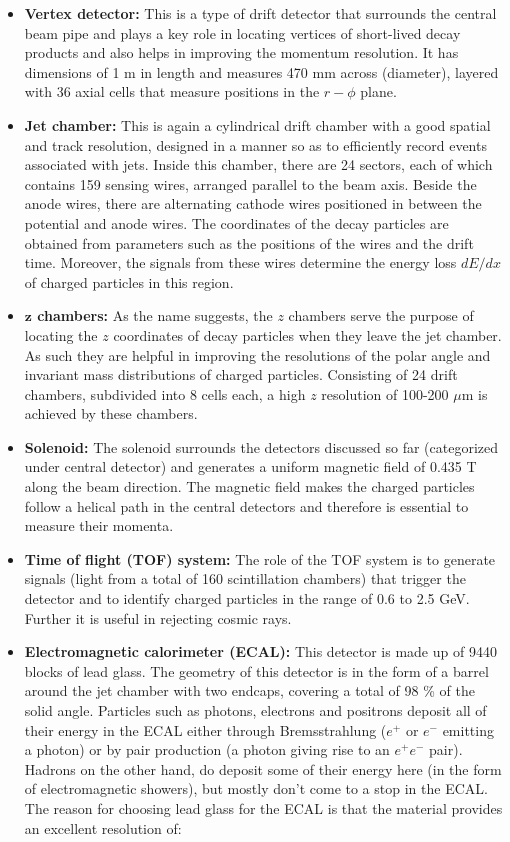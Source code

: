 \begin{itemize}
\item \textbf{Vertex detector:} This is a type of drift detector that surrounds the central beam pipe and plays a key role in locating vertices of short-lived decay products and also helps in improving the momentum resolution. It has dimensions of 1 m in length and measures 470 mm across (diameter), layered with 36 axial cells that measure positions in the $r-\phi$ plane.  
\item \textbf{Jet chamber:} This is again a cylindrical drift chamber with a good spatial and track resolution, designed in a manner so as to efficiently record events associated with jets. Inside this chamber, there are 24 sectors, each of which contains 159 sensing wires, arranged parallel to the beam axis. Beside the anode wires, there are alternating cathode wires positioned in between the potential and anode wires. The coordinates of the decay particles are obtained from parameters such as the positions of the wires and the drift time. Moreover, the signals from these wires determine the energy loss $dE/dx$ of charged particles in this region.
\item \textbf{$\mathbf{z}$ chambers:} As the name suggests, the $z$ chambers serve the purpose of locating the $z$ coordinates of decay particles when they leave the jet chamber. As such they are helpful in improving the resolutions of the polar angle and invariant mass distributions of charged particles. Consisting of 24 drift chambers, subdivided into 8 cells each, a high $z$ resolution of 100-200 $\mu$m is achieved by these chambers.
\item \textbf{Solenoid:} The solenoid surrounds the detectors discussed so far (categorized under central detector) and generates a uniform magnetic field of 0.435 T along the beam direction. The magnetic field makes the charged particles follow a helical path in the central detectors and therefore is essential to measure their momenta. 
\item \textbf{Time of flight (TOF) system:} The role of the TOF system is to generate signals (light from a total of 160 scintillation chambers) that trigger the detector and to identify charged particles in the range of 0.6 to 2.5 GeV. Further it is useful in rejecting cosmic rays.
\item \textbf{Electromagnetic calorimeter (ECAL):} This detector is made up of 9440 blocks of lead glass. The geometry of this detector is in the form of a barrel around the jet chamber with two endcaps, covering a total of 98 \% of the solid angle. Particles such as photons, electrons and positrons deposit all of their energy in the ECAL either through Bremsstrahlung ($e^{+}$ or $e^{-}$ emitting a photon) or by pair production (a photon giving rise to an $e^{+}e^{-}$ pair). Hadrons on the other hand, do deposit some of their energy here (in the form of electromagnetic showers), but mostly don't come to a stop in the ECAL. The reason for choosing lead glass for the ECAL is that the material provides an excellent resolution of:

\end{itemize}
